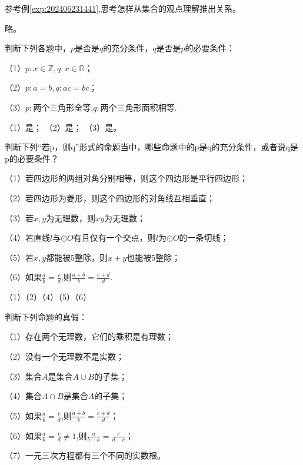 \documentclass[lang=cn,newtx,10pt,scheme=chinese]{elegantbook}
\begin{document}
\begin{exercise}\label{202406262000}
  参考例\ref{exp:202406231441},思考怎样从集合的观点理解推出关系。
\end{exercise}
\begin{solution}
  略。
\end{solution}
\begin{exercise}\label{202406262010}
  判断下列各题中，$p$是否是$q$的充分条件，$q$是否是$p$的必要条件：

  （1）$p:x\in\mathbb{Z},q:x\in\mathbb{R}$；

  （2）$p:a=b,q:ac=bc$；

  （3）$p:$两个三角形全等,$q:$两个三角形面积相等.
\end{exercise}
\begin{solution}
  （1）是；
  （2）是；
  （3）是。
\end{solution}
\begin{exercise}\label{202406262101}
  判断下列“若p，则q”形式的命题当中，哪些命题中的p是q的充分条件，或者说q是p的必要条件？

  （1）若四边形的两组对角分别相等，则这个四边形是平行四边形；

  （2）若四边形为菱形，则这个四边形的对角线互相垂直；

  （3）若$x,y$为无理数，则$xy$为无理数；

  （4）若直线$l$与$\odot O$有且仅有一个交点，则$l$为$\odot O$的一条切线；

  （5）若$x,y$都能被5整除，则$x+y$也能被5整除；

  （6）如果$\frac{a}{b}=\frac{c}{d}$,则$\frac{a+b}{b}=\frac{c+d}{d}$.
\end{exercise}
\begin{solution}
  （1）（2）（4）（5）（6）
\end{solution}
\begin{exercise}\label{RJB_P26}
  判断下列命题的真假：

  （1）存在两个无理数，它们的乘积是有理数；

  （2）没有一个无理数不是实数；

  （3）集合$A$是集合$A\cup B$的子集；

  （4）集合$A\cap B$是集合$A$的子集；

  （5）如果$\frac ab=\frac cd$,则$\frac{a+b}b=\frac{c+d}{d}$；

  （6）如果$\frac ab=\frac cd\neq 1$,则$\frac a{b-a}=\frac c{d-c}$；
  
  （7）一元三次方程都有三个不同的实数根。
\end{exercise}
\end{document}
